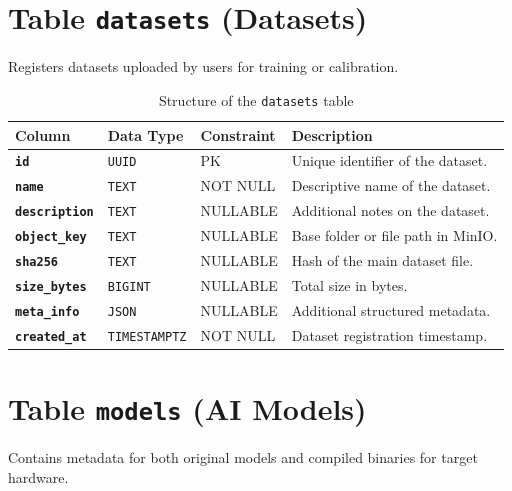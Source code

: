 \clearpage

\section{Table \texttt{datasets} (Datasets)}
Registers datasets uploaded by users for training or calibration.

\begin{table}[H]
    \centering
    \caption{Structure of the \texttt{datasets} table}
    \label{tab:datasets}
    \begin{tabular}{p{}
                    p{}
                    p{}
                    p{}}
        \hline
        \textbf{Column} & \textbf{Data Type} & \textbf{Constraint} & \textbf{Description} \\
        \hline
        \textbf{\texttt{id}} & \texttt{UUID} & \gls{PK} & Unique identifier of the dataset. \\
        \textbf{\texttt{name}} & \texttt{TEXT} & NOT NULL & Descriptive name of the dataset. \\
        \textbf{\texttt{description}} & \texttt{TEXT} & NULLABLE & Additional notes on the dataset. \\
        \textbf{\texttt{object\_key}} & \texttt{TEXT} & NULLABLE & Base folder or file path in MinIO. \\
        \textbf{\texttt{sha256}} & \texttt{TEXT} & NULLABLE & Hash of the main dataset file. \\
        \textbf{\texttt{size\_bytes}} & \texttt{BIGINT} & NULLABLE & Total size in bytes. \\
        \textbf{\texttt{meta\_info}} & \texttt{JSON} & NULLABLE & Additional structured metadata. \\
        \textbf{\texttt{created\_at}} & \texttt{TIMESTAMPTZ} & NOT NULL & Dataset registration timestamp. \\
        \hline
    \end{tabular}
\end{table}

\section{Table \texttt{models} (\texorpdfstring{\gls{AI}}{AI} Models)}
Contains metadata for both original models and compiled binaries for target hardware.

